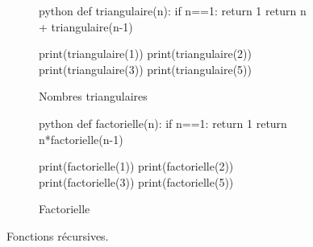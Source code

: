 \begin{figure}[h!]
\begin{subfigure}{.5\textwidth}
\begin{mintedbox}{python}
def triangulaire(n):
	if n==1:
		return 1
	return n + triangulaire(n-1)
	
print(triangulaire(1))
print(triangulaire(2))
print(triangulaire(3))
print(triangulaire(5))
\end{mintedbox}
\caption{Nombres triangulaires}
\label{fig:3a}
\end{subfigure}
\begin{subfigure}{.5\textwidth}
\begin{mintedbox}{python}
def factorielle(n):
	if n==1:
		return 1
	return n*factorielle(n-1)
	
print(factorielle(1))
print(factorielle(2))
print(factorielle(3))
print(factorielle(5))
\end{mintedbox}
\caption{Factorielle}
\label{fig:3b}
\end{subfigure}

\caption{Fonctions récursives.}
\label{fig:3}
\end{figure}




